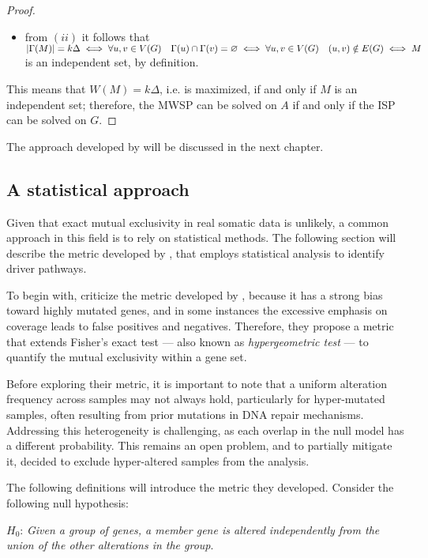 \begin{proof}
\begin{itemize}
        \item from $(ii)$ it follows that $\left|\Gamma(M)\right| = k \Delta \iff \forall u, v \in V(G) \quad \Gamma(u) \cap \Gamma(v) = \varnothing \iff \forall u, v \in V(G) \quad (u, v) \notin E(G) \iff M$ is an independent set, by definition.
    \end{itemize}

    This means that $W(M) = k \Delta$, i.e. is maximized, if and only if $M$ is an independent set; therefore, the MWSP can be solved on $A$ if and only if the ISP can be solved on $G$.
\end{proof}

The approach developed by \textcite{dendrix} will be discussed in the next chapter.

\subsection{A statistical approach} \label{mutex_chap2}

Given that exact mutual exclusivity in real somatic data is unlikely, a common approach in this field is to rely on statistical methods. The following section will describe the metric developed by \textcite{mutex}, that employs statistical analysis to identify driver pathways.

To begin with, \textcite{mutex} criticize the metric developed by \textcite{dendrix}, because it has a strong bias toward highly mutated genes, and in some instances the excessive emphasis on coverage leads to false positives and negatives. Therefore, they propose a metric that extends Fisher's exact test --- also known as \textit{hypergeometric test} --- to quantify the mutual exclusivity within a gene set.

Before exploring their metric, it is important to note that a uniform alteration frequency across samples may not always hold, particularly for hyper-mutated samples, often resulting from prior mutations in DNA repair mechanisms. Addressing this heterogeneity is challenging, as each overlap in the null model has a different probability. This remains an open problem, and to partially mitigate it, \textcite{mutex} decided to exclude hyper-altered samples from the analysis.

The following definitions will introduce the metric they developed. Consider the following null hypothesis:

\begin{displayquote} \label{H_0}
    $H_0$: \textit{Given a group of genes, a member gene is altered independently from the union of the other alterations in the group}.
\end{displayquote}

